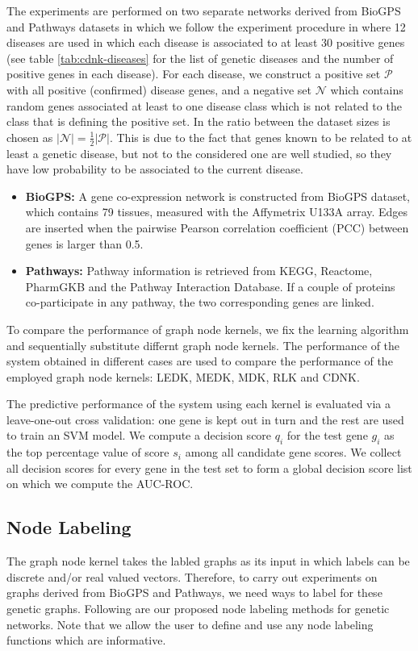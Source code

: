 \documentclass[review]{elsarticle}
\begin{document}
The experiments are performed on two separate networks derived from BioGPS and Pathways datasets in which we follow the experiment procedure in \cite{chen2014disease} where 12 diseases \cite{goh2007human} are used in which each disease is associated to at least 30 positive genes (see table \ref{tab:cdnk-diseases} for the list of genetic diseases and the number of positive genes in each disease). For each disease, we construct a positive set $\mathcal{P}$ with all positive (confirmed) disease genes, and a negative set $\mathcal{N}$ which contains random genes associated at least to one disease class which is not related to the class that is defining the positive set. In \cite{chen2014disease} the ratio between the dataset sizes is chosen as $\vert \mathcal{N} \vert = \frac{1}{2} \vert \mathcal{P} \vert$. This is due to the fact that genes known to be related to at least a genetic disease, but not to the considered one are well studied, so they have low probability to be associated to the current disease.
\begin{itemize}
\item \textbf{BioGPS:} A gene co-expression network is constructed from BioGPS dataset, which contains 79 tissues, measured with the Affymetrix U133A array. Edges are inserted when the pairwise Pearson correlation coefficient (PCC) between genes is larger than 0.5.

\item \textbf{Pathways:} Pathway information is retrieved from KEGG, Reactome, PharmGKB and the Pathway Interaction Database. If a couple of proteins co-participate in any pathway, the two corresponding genes are linked.  
\end{itemize}
To compare the performance of graph node kernels, we fix the learning algorithm and sequentially substitute differnt graph node kernels. The performance of the system obtained in different cases are used to compare the performance of the employed graph node kernels: LEDK, MEDK, MDK, RLK and CDNK.

The predictive performance of the system using each kernel is evaluated via a leave-one-out cross validation: one gene is kept out in turn and the rest are used to train an SVM model. We compute a decision score $q_i$ for the test gene $g_i$ as the top percentage value of score $s_i$ among all candidate gene scores. We collect all decision scores for every gene in the test set to form a global decision score list on which we compute the AUC-ROC.

\subsection{Node Labeling} 
\label{sec:lab}
The graph node kernel takes the labled graphs as its input in which labels can be discrete and/or real valued vectors. Therefore, to carry out experiments on graphs derived from BioGPS and Pathways, we need ways to label for these genetic graphs. Following are our proposed node labeling methods for genetic networks. Note that we allow the user to define and use any node labeling functions which are informative.
\end{document}
